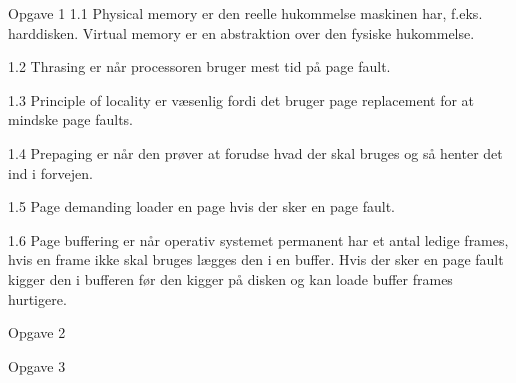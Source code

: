 Opgave 1
1.1
Physical memory er den reelle hukommelse maskinen har, f.eks. harddisken.
Virtual memory er en abstraktion over den fysiske hukommelse.

1.2
Thrasing er når processoren bruger mest tid på page fault.

1.3
Principle of locality er væsenlig fordi det bruger page replacement for at mindske page faults.

1.4
Prepaging er når den prøver at forudse hvad der skal bruges og så henter det ind i forvejen.

1.5
Page demanding loader en page hvis der sker en page fault.

1.6
Page buffering er når operativ systemet permanent har et antal ledige frames, hvis en frame ikke skal bruges lægges den i en buffer. Hvis der sker en page fault kigger den i bufferen før den kigger på disken og kan loade buffer frames hurtigere.

Opgave 2

Opgave 3

